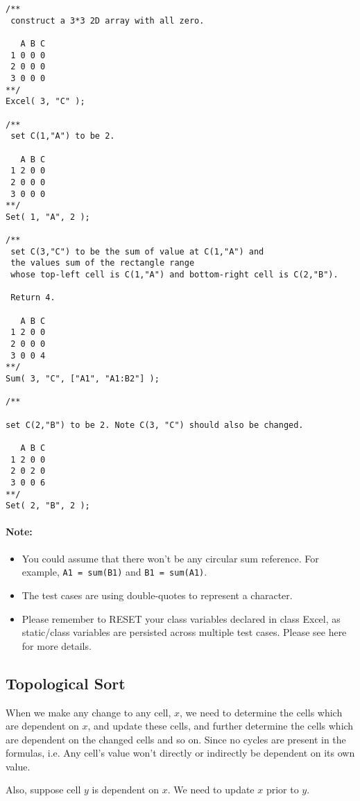 \begin{lstlisting}[style=customc]
/**
 construct a 3*3 2D array with all zero.

   A B C
 1 0 0 0
 2 0 0 0
 3 0 0 0
**/
Excel( 3, "C" );

/**
 set C(1,"A") to be 2.

   A B C
 1 2 0 0
 2 0 0 0
 3 0 0 0
**/
Set( 1, "A", 2 );

/**
 set C(3,"C") to be the sum of value at C(1,"A") and
 the values sum of the rectangle range
 whose top-left cell is C(1,"A") and bottom-right cell is C(2,"B").

 Return 4.

   A B C
 1 2 0 0
 2 0 0 0
 3 0 0 4
**/
Sum( 3, "C", ["A1", "A1:B2"] );

/**

set C(2,"B") to be 2. Note C(3, "C") should also be changed.

   A B C
 1 2 0 0
 2 0 2 0
 3 0 0 6
**/
Set( 2, "B", 2 );
\end{lstlisting}

\paragraph{Note:}

\begin{itemize}
\item You could assume that there won't be any circular sum reference. For example, \texttt{A1 = sum(B1)} and \texttt{B1 = sum(A1)}.
\item The test cases are using double-quotes to represent a character.
\item Please remember to RESET your class variables declared in class Excel, as static/class variables are persisted across multiple test cases. Please see here for more details.
\end{itemize}

\subsection{Topological Sort}
When we make any change to any cell, $x$, we need to determine the cells which are dependent on $x$, and update these cells, and further determine the cells which are dependent on the changed cells and so on. Since no cycles are present in the formulas, i.e. Any cell's value won't directly or indirectly be dependent on its own value.

Also, suppose cell $y$ is dependent on $x$. We need to update $x$  prior to $y$.

